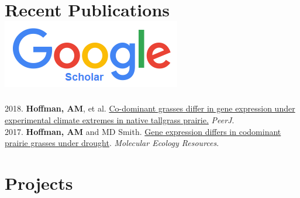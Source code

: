 \documentclass[letterpaper]{twentysecondcv} %
\begin{document}
\section{Recent Publications  \href{https://scholar.google.com/citations?user=k6RyLHsAAAAJ&hl=en}{{\includegraphics[scale=0.18]{img/Google_Scholar_logo_2015.png}} } }
2018. \textbf{Hoffman, AM}, et al. \href{https://peerj.com/articles/4394.pdf}{Co-dominant grasses differ in gene expression under experimental climate extremes in native tallgrass prairie.} \textit{PeerJ}.\\

2017. \textbf{Hoffman, AM} and MD Smith. \href{http://onlinelibrary.wiley.com/doi/10.1111/1755-0998.12733/full}{Gene expression differs in codominant prairie grasses under drought}. \textit{Molecular Ecology Resources}.\\



\section{Projects}
\end{document}
